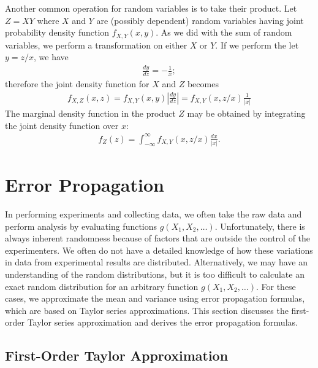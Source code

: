 Another common operation for random variables is to take their product. Let $Z = XY$ where $X$ and $Y$ are (possibly dependent) random variables having joint probability density function $f_{X,Y}(x,y)$. As we did with the sum of random variables, we perform a transformation on either $X$ or $Y$. If we perform the let $y = z/x$, we have
\begin{align}
  \frac{dy}{dz} = -\frac{1}{x} ; \nonumber
\end{align}
therefore the joint density function for $X$ and $Z$ becomes
\begin{align}
  f_{X,Z}(x,z) = f_{X,Y}(x,y) \left| \frac{dy}{dz} \right| =  f_{X,Y}(x,z/x) \frac{1}{|x|}
\end{align}
The marginal density function in the product $Z$ may be obtained by integrating the joint density function over $x$:
\begin{align}
  f_Z(z) = \int_{-\infty}^\infty f_{X,Y}(x,z/x) \frac{dx}{|x|} .
\end{align}

\section{Error Propagation}

In performing experiments and collecting data, we often take the raw data and perform analysis by evaluating functions $g(X_1,X_2,\ldots)$. Unfortunately, there is always inherent randomness because of factors that are outside the control of the experimenters. We often do not have a detailed knowledge of how these variations in data from experimental results are distributed. Alternatively, we may have an understanding of the random distributions, but it is too difficult to calculate an exact random distribution for an arbitrary function $g(X_1,X_2,\ldots)$. For these cases, we approximate the mean and variance using error propagation formulas, which are based on Taylor series approximations. This section discusses the first-order Taylor series approximation and derives the error propagation formulas.


\subsection{First-Order Taylor Approximation}


